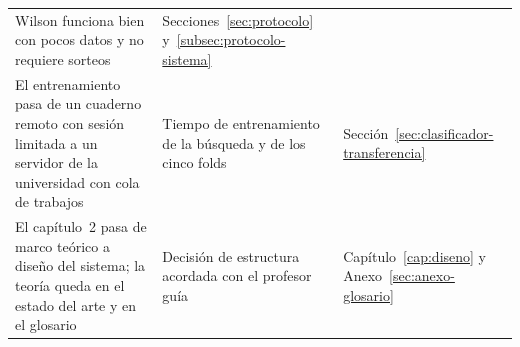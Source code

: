 {\begin{longtable}{>{\raggedright\arraybackslash}p{5.4cm}>{\raggedright\arraybackslash}p{3.5cm}>{\raggedright\arraybackslash}p{3.5cm}}
Wilson funciona bien con pocos datos y no requiere sorteos &
Secciones~\ref{sec:protocolo} y~\ref{subsec:protocolo-sistema} \\
\addlinespace
El entrenamiento pasa de un cuaderno remoto con sesión limitada a un servidor
de la universidad con cola de trabajos &
Tiempo de entrenamiento de la búsqueda y de los cinco folds &
Sección~\ref{sec:clasificador-transferencia} \\
\addlinespace
El capítulo~2 pasa de marco teórico a diseño del sistema; la teoría queda en el
estado del arte y en el glosario &
Decisión de estructura acordada con el profesor guía &
Capítulo~\ref{cap:diseno} y Anexo~\ref{sec:anexo-glosario} \\
\end{longtable}
}

